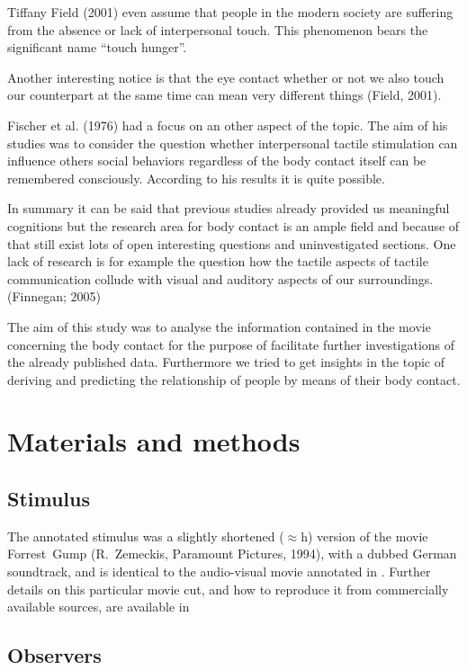 \documentclass[10pt,a4paper]{article}
\begin{document}
Tiffany Field (2001) even assume that people in the modern society are
suffering from the absence or lack of interpersonal touch. This phenomenon
bears the significant name “touch hunger”.

Another interesting notice is that the eye contact whether or not we also touch
our counterpart at the same time can mean very different  things (Field, 2001).

Fischer et al. (1976) had a focus on an other aspect of the topic. The aim of
his studies was to consider the question whether interpersonal tactile
stimulation can influence others social behaviors regardless of the body
contact itself can be remembered consciously. According to his results it is
quite possible.

In summary it can be said that previous studies already provided us meaningful
cognitions but the research area for body contact is an ample field and because
of that still exist lots of open interesting questions and uninvestigated
sections.  One lack of research is for example the question how the tactile
aspects of tactile communication collude with visual and auditory aspects of
our surroundings. (Finnegan; 2005)

The aim of this study was to analyse the information contained in the movie
concerning the body contact for the purpose of facilitate further
investigations of the already published data. Furthermore we tried to get
insights in the topic of deriving and predicting the relationship of people by
means of their body contact.


\section*{Materials and methods}

\subsection*{Stimulus}

The annotated stimulus was a slightly shortened ($\approx$\unit[2]{h}) version
of the movie Forrest~Gump (R.~Zemeckis, Paramount Pictures, 1994), with a dubbed
German soundtrack, and is identical to the audio-visual movie annotated in
\cite{LRS+2015,HH2016}. Further details on this particular movie cut, and how
to reproduce it from commercially available sources, are available in
\cite{HAK+16}

\subsection*{Observers} %
\end{document}
